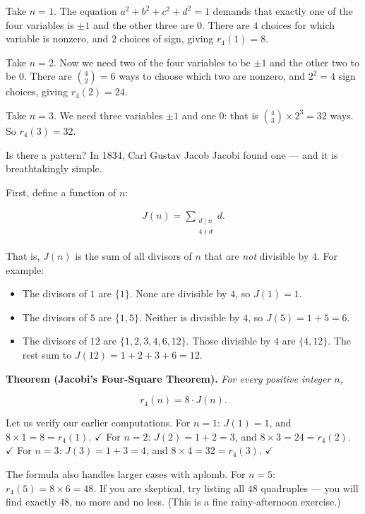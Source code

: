 \documentclass[11pt,twoside,openright]{book}
\theoremstyle{definition}
\theoremstyle{remark}
\begin{document}
Take $n = 1$. The equation $a^2 + b^2 + c^2 + d^2 = 1$ demands that exactly one of the four variables is $\pm 1$ and the other three are $0$. There are $4$ choices for which variable is nonzero, and $2$ choices of sign, giving $r_4(1) = 8$.

Take $n = 2$. Now we need two of the four variables to be $\pm 1$ and the other two to be $0$. There are $\binom{4}{2} = 6$ ways to choose which two are nonzero, and $2^2 = 4$ sign choices, giving $r_4(2) = 24$.

Take $n = 3$. We need three variables $\pm 1$ and one $0$: that is $\binom{4}{3} \times 2^3 = 32$ ways. So $r_4(3) = 32$.

Is there a pattern? In 1834, Carl Gustav Jacob Jacobi found one --- and it is breathtakingly simple.

First, define a function of $n$:

\begin{align*}
J(n) = \sum_{\substack{d \mid n \\ 4 \nmid d}} d.
\end{align*}

That is, $J(n)$ is the sum of all divisors of $n$ that are \textit{not} divisible by $4$. For example:

\begin{itemize}
  \item The divisors of $1$ are $\{1\}$. None are divisible by $4$, so $J(1) = 1$.
  \item The divisors of $5$ are $\{1, 5\}$. Neither is divisible by $4$, so $J(5) = 1 + 5 = 6$.
  \item The divisors of $12$ are $\{1, 2, 3, 4, 6, 12\}$. Those divisible by $4$ are $\{4, 12\}$. The rest sum to $J(12) = 1 + 2 + 3 + 6 = 12$.
\end{itemize}

\textbf{Theorem (Jacobi's Four-Square Theorem).} \textit{For every positive integer $n$,}

\[r_4(n) = 8 \cdot J(n).\]


Let us verify our earlier computations. For $n = 1$: $J(1) = 1$, and $8 \times 1 = 8 = r_4(1)$. $\checkmark$ For $n = 2$: $J(2) = 1 + 2 = 3$, and $8 \times 3 = 24 = r_4(2)$. $\checkmark$ For $n = 3$: $J(3) = 1 + 3 = 4$, and $8 \times 4 = 32 = r_4(3)$. $\checkmark$

The formula also handles larger cases with aplomb. For $n = 5$: $r_4(5) = 8 \times 6 = 48$. If you are skeptical, try listing all $48$ quadruples --- you will find exactly $48$, no more and no less. (This is a fine rainy-afternoon exercise.)
\end{document}
